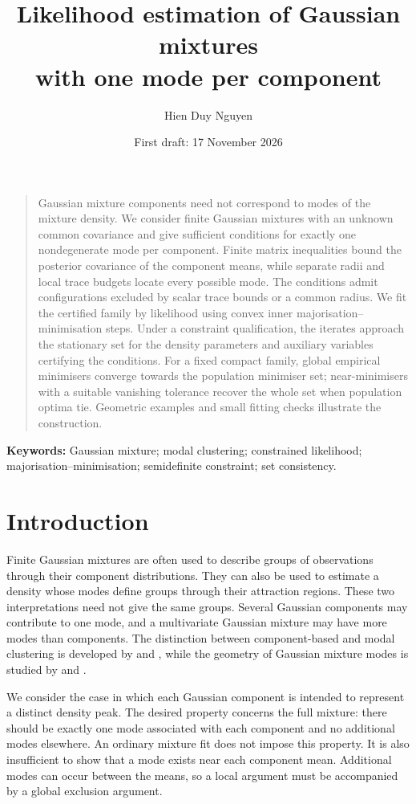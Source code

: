 \documentclass[12pt,a4paper]{article}
\title{Likelihood estimation of Gaussian mixtures\\with one mode per component}
\author{Hien Duy Nguyen}
\date{First draft: 17 November 2026}
\renewenvironment{abstract}{\begin{center}\bfseries\abstractname\end{center}\begin{quote}\normalsize}{\end{quote}}
\theoremstyle{remark}
\begin{document}
\maketitle

\begin{abstract}
Gaussian mixture components need not correspond to modes of the mixture density. We consider finite Gaussian mixtures with an unknown common covariance and give sufficient conditions for exactly one nondegenerate mode per component. Finite matrix inequalities bound the posterior covariance of the component means, while separate radii and local trace budgets locate every possible mode. The conditions admit configurations excluded by scalar trace bounds or a common radius. We fit the certified family by likelihood using convex inner majorisation--minimisation steps. Under a constraint qualification, the iterates approach the stationary set for the density parameters and auxiliary variables certifying the conditions. For a fixed compact family, global empirical minimisers converge towards the population minimiser set; near-minimisers with a suitable vanishing tolerance recover the whole set when population optima tie. Geometric examples and small fitting checks illustrate the construction.
\end{abstract}

\noindent\textbf{Keywords:} Gaussian mixture; modal clustering; constrained likelihood;\\
majorisation--minimisation; semidefinite constraint; set consistency.

\section{Introduction}\label{sec:introduction}

Finite Gaussian mixtures are often used to describe groups of observations through their component distributions. They can also be used to estimate a density whose modes define groups through their attraction regions. These two interpretations need not give the same groups. Several Gaussian components may contribute to one mode, and a multivariate Gaussian mixture may have more modes than components. The distinction between component-based and modal clustering is developed by \citet{hennig2010} and \citet{chacon2019}, while the geometry of Gaussian mixture modes is studied by \citet{carreira2003} and \citet{ray2005}.

We consider the case in which each Gaussian component is intended to represent a distinct density peak. The desired property concerns the full mixture: there should be exactly one mode associated with each component and no additional modes elsewhere. An ordinary mixture fit does not impose this property. It is also insufficient to show that a mode exists near each component mean. Additional modes can occur between the means, so a local argument must be accompanied by a global exclusion argument.
\end{document}
